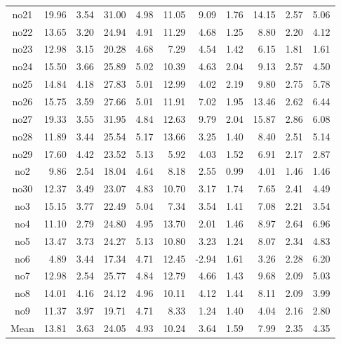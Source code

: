{\begin{longtable}{@{}cr@{\hspace{1em}}r@{\hspace{1em}}r@{\hspace{1em}}r@{\hspace{1em}}r@{\hspace{2em}}r@{\hspace{1em}}r@{\hspace{1em}}r@{\hspace{1em}}r@{\hspace{1em}}r@{}}
no21&19.96&3.54&31.00&4.98&11.05&9.09&1.76&14.15&2.57&5.06\\
no22&13.65&3.20&24.94&4.91&11.29&4.68&1.25&8.80&2.20&4.12\\
no23&12.98&3.15&20.28&4.68&7.29&4.54&1.42&6.15&1.81&1.61\\
no24&15.50&3.66&25.89&5.02&10.39&4.63&2.04&9.13&2.57&4.50\\
no25&14.84&4.18&27.83&5.01&12.99&4.02&2.19&9.80&2.75&5.78\\
no26&15.75&3.59&27.66&5.01&11.91&7.02&1.95&13.46&2.62&6.44\\
no27&19.33&3.55&31.95&4.84&12.63&9.79&2.04&15.87&2.86&6.08\\
no28&11.89&3.44&25.54&5.17&13.66&3.25&1.40&8.40&2.51&5.14\\
no29&17.60&4.42&23.52&5.13&5.92&4.03&1.52&6.91&2.17&2.87\\
no2&9.86&2.54&18.04&4.64&8.18&2.55&0.99&4.01&1.46&1.46\\
no30&12.37&3.49&23.07&4.83&10.70&3.17&1.74&7.65&2.41&4.49\\
no3&15.15&3.77&22.49&5.04&7.34&3.54&1.41&7.08&2.21&3.54\\
no4&11.10&2.79&24.80&4.95&13.70&2.01&1.46&8.97&2.64&6.96\\
no5&13.47&3.73&24.27&5.13&10.80&3.23&1.24&8.07&2.34&4.83\\
no6&4.89&3.44&17.34&4.71&12.45&-2.94&1.61&3.26&2.28&6.20\\
no7&12.98&2.54&25.77&4.84&12.79&4.66&1.43&9.68&2.09&5.03\\
no8&14.01&4.16&24.12&4.96&10.11&4.12&1.44&8.11&2.09&3.99\\
no9&11.37&3.97&19.71&4.71&8.33&1.24&1.40&4.04&2.16&2.80\\
\midrule
Mean&13.81&3.63&24.05&4.93&10.24&3.64&1.59&7.99&2.35&4.35\\
\bottomrule
\end{longtable}}
